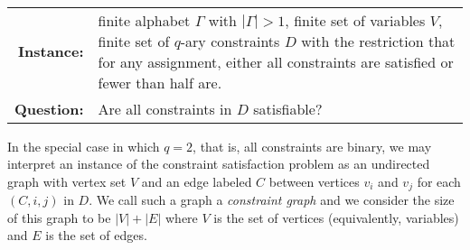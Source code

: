 \begin{definition}
  \mbox{} \\
  \begin{tabular}{r p{9.5cm}}
    \textbf{Instance:} & finite alphabet $\Gamma$ with $|\Gamma| > 1$, finite set of variables $V$, finite set of $q$-ary constraints $D$ with the restriction that for any assignment, either all constraints are satisfied or fewer than half are. \\
    \textbf{Question:} & Are all constraints in $D$ satisfiable?
  \end{tabular}
\end{definition}

In the special case in which $q = 2$, that is, all constraints are binary, we may interpret an instance of the constraint satisfaction problem as an undirected graph with vertex set $V$ and an edge labeled $C$ between vertices $v_i$ and $v_j$ for each $(C, i, j)$ in $D$.
We call such a graph a \emph{constraint graph} and we consider the size of this graph to be $|V| + |E|$ where $V$ is the set of vertices (equivalently, variables) and $E$ is the set of edges.

